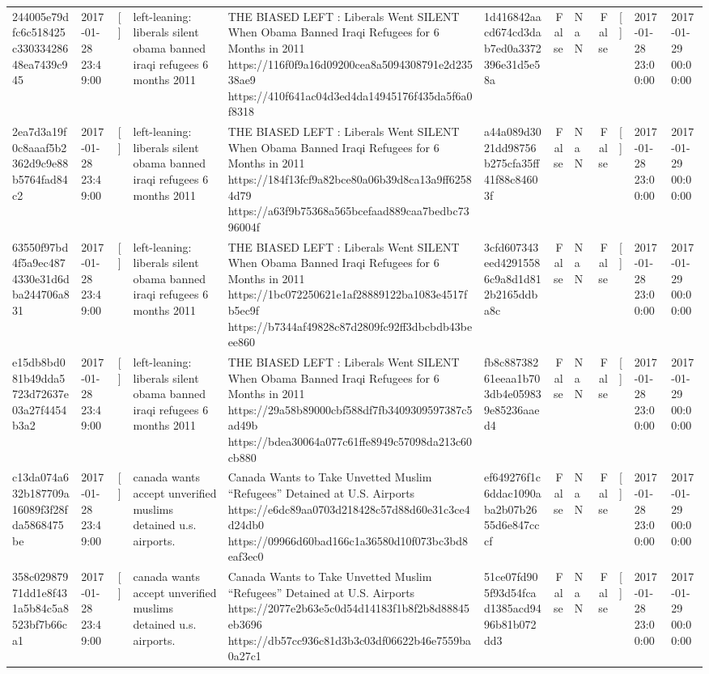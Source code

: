 \begin{tabular}{llllllrlrlll}
244005e79dfc6c518425c33033428648ea7439c945 & 2017-01-28 23:49:00 & [] & left-leaning: liberals silent obama banned iraqi refugees 6 months 2011 & THE BIASED LEFT : Liberals Went SILENT When Obama Banned Iraqi Refugees for 6 Months in 2011 https://116f0f9a16d09200cea8a5094308791e2d23538ae9 https://410f641ac04d3ed4da14945176f435da5f6a0f8318 & 1d416842aacd674cd3dab7ed0a3372396e31d5e58a & False & NaN & False & [] & 2017-01-28 23:00:00 & 2017-01-29 00:00:00 \\
2ea7d3a19f0c8aaaf5b2362d9c9e88b5764fad84c2 & 2017-01-28 23:49:00 & [] & left-leaning: liberals silent obama banned iraqi refugees 6 months 2011 & THE BIASED LEFT : Liberals Went SILENT When Obama Banned Iraqi Refugees for 6 Months in 2011 https://184f13fcf9a82bce80a06b39d8ca13a9ff62584d79 https://a63f9b75368a565bcefaad889caa7bedbc7396004f & a44a089d3021dd98756b275cfa35ff41f88c84603f & False & NaN & False & [] & 2017-01-28 23:00:00 & 2017-01-29 00:00:00 \\
63550f97bd4f5a9ec4874330e31d6dba244706a831 & 2017-01-28 23:49:00 & [] & left-leaning: liberals silent obama banned iraqi refugees 6 months 2011 & THE BIASED LEFT : Liberals Went SILENT When Obama Banned Iraqi Refugees for 6 Months in 2011 https://1bc072250621e1af28889122ba1083e4517fb5ec9f https://b7344af49828c87d2809fc92ff3dbcbdb43beee860 & 3cfd607343eed42915586c9a8d1d812b2165ddba8c & False & NaN & False & [] & 2017-01-28 23:00:00 & 2017-01-29 00:00:00 \\
e15db8bd081b49dda5723d72637e03a27f4454b3a2 & 2017-01-28 23:49:00 & [] & left-leaning: liberals silent obama banned iraqi refugees 6 months 2011 & THE BIASED LEFT : Liberals Went SILENT When Obama Banned Iraqi Refugees for 6 Months in 2011 https://29a58b89000cbf588df7fb3409309597387c5ad49b https://bdea30064a077c61ffe8949c57098da213c60cb880 & fb8c88738261eeaa1b703db4e059839e85236aaed4 & False & NaN & False & [] & 2017-01-28 23:00:00 & 2017-01-29 00:00:00 \\
c13da074a632b187709a16089f3f28fda5868475be & 2017-01-28 23:49:00 & [] & canada wants accept unverified muslims detained u.s. airports. & Canada Wants to Take Unvetted Muslim “Refugees” Detained at U.S. Airports https://e6dc89aa0703d218428c57d88d60e31c3ce4d24db0 https://09966d60bad166c1a36580d10f073bc3bd8eaf3ec0 & ef649276f1c6ddac1090aba2b07b2655d6e847cccf & False & NaN & False & [] & 2017-01-28 23:00:00 & 2017-01-29 00:00:00 \\
358c02987971dd1e8f431a5b84c5a8523bf7b66ca1 & 2017-01-28 23:49:00 & [] & canada wants accept unverified muslims detained u.s. airports. & Canada Wants to Take Unvetted Muslim “Refugees” Detained at U.S. Airports https://2077e2b63e5c0d54d14183f1b8f2b8d88845eb3696 https://db57cc936c81d3b3c03df06622b46e7559ba0a27c1 & 51ce07fd905f93d54fcad1385acd9496b81b072dd3 & False & NaN & False & [] & 2017-01-28 23:00:00 & 2017-01-29 00:00:00 \\

\end{tabular}
